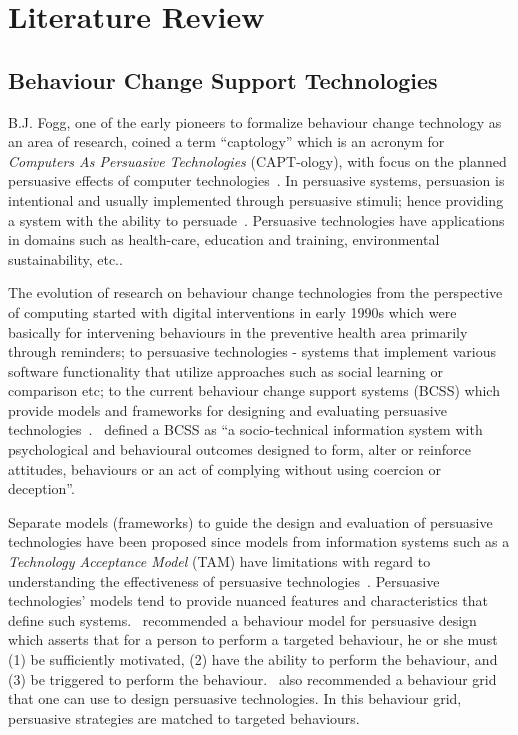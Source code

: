 
\chapter{Literature Review} %

\label{literaturereview} %


\section{Behaviour Change Support Technologies}
B.J. Fogg, one of the early pioneers to formalize behaviour change technology as an area of research, coined a term “captology” which is an acronym for \emph{Computers As Persuasive Technologies} (CAPT-ology), with focus on the planned persuasive effects of computer technologies~\citep{fogg1999persuasive}. In persuasive systems, persuasion is intentional and usually implemented through persuasive stimuli; hence providing a system with the ability to persuade~\citep{hamari2014persuasive}. Persuasive technologies have applications in domains such as health-care, education and training, environmental sustainability, etc..

The evolution of research on behaviour change technologies from the perspective of computing started with digital interventions in early 1990s which were basically for intervening behaviours in the preventive health area primarily through reminders; to persuasive technologies - systems that implement various software functionality that utilize approaches such as social learning or comparison etc; to the current behaviour change support systems (BCSS) which provide models and frameworks for designing and evaluating persuasive technologies~\citep{langrial2012digital}.~\cite{Oinas-Kukkonen:foundation} defined a BCSS  as ``a socio-technical information system with psychological and behavioural outcomes designed to form, alter or reinforce attitudes, behaviours or an act of complying without using coercion or deception''.

Separate models (frameworks) to guide the design and evaluation of persuasive technologies have been proposed since models from information systems such as a \emph{Technology Acceptance Model} (TAM) have limitations with regard to understanding the effectiveness of persuasive technologies~\citep{Oinas-kukkonen:psd}. Persuasive technologies' models tend to provide nuanced features and characteristics that define such systems.~\cite{fogg2009behavior} recommended a behaviour model for persuasive design which asserts that for a person to perform a targeted behaviour, he or she must (1) be sufficiently motivated, (2) have the ability to perform the behaviour, and (3) be triggered to perform the behaviour.~\cite{fogg2009behavior2} also recommended a behaviour grid that one can use to design persuasive technologies. In this behaviour grid, persuasive strategies are matched to targeted behaviours. 

